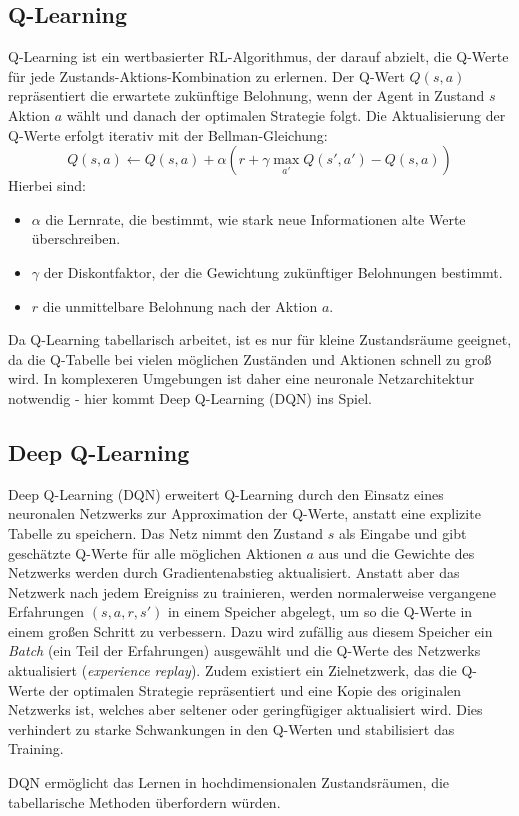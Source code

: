 \subsection{Q-Learning}
Q-Learning ist ein wertbasierter RL-Algorithmus, der darauf abzielt, die Q-Werte 
für jede Zustands-Aktions-Kombination zu erlernen. Der Q-Wert $Q(s,a)$ repräsentiert 
die erwartete zukünftige Belohnung, wenn der Agent in Zustand $s$ Aktion $a$ wählt 
und danach der optimalen Strategie folgt.
Die Aktualisierung der Q-Werte erfolgt iterativ mit der Bellman-Gleichung:
\begin{equation}
    Q(s,a) \leftarrow Q(s,a) + \alpha (r + \gamma \max_{a'}Q(s',a') - Q(s,a))
\end{equation}
Hierbei sind:
\begin{itemize}
    \item $\alpha$ die Lernrate, die bestimmt, wie stark neue Informationen alte Werte überschreiben.
    \item $\gamma$ der Diskontfaktor, der die Gewichtung zukünftiger Belohnungen bestimmt.
    \item $r$ die unmittelbare Belohnung nach der Aktion $a$.
\end{itemize}
Da Q-Learning tabellarisch arbeitet, ist es nur für kleine Zustandsräume geeignet, 
da die Q-Tabelle bei vielen möglichen Zuständen und Aktionen schnell zu groß wird. 
In komplexeren Umgebungen ist daher eine neuronale Netzarchitektur notwendig - 
hier kommt Deep Q-Learning (DQN) ins Spiel.

\subsection{Deep Q-Learning}
Deep Q-Learning (DQN) erweitert Q-Learning durch den Einsatz eines neuronalen 
Netzwerks zur Approximation der Q-Werte, anstatt eine explizite Tabelle zu 
speichern. Das Netz nimmt den Zustand $s$ als Eingabe und gibt geschätzte Q-Werte 
für alle möglichen Aktionen $a$ aus und die Gewichte des Netzwerks werden durch 
Gradientenabstieg aktualisiert. Anstatt aber das Netzwerk nach jedem Ereigniss zu 
trainieren, werden normalerweise vergangene Erfahrungen $(s,a,r,s')$ in einem 
Speicher abgelegt, um so die Q-Werte in einem großen Schritt zu verbessern.
Dazu wird zufällig aus diesem Speicher ein \textit{Batch} (ein Teil der Erfahrungen) 
ausgewählt und die Q-Werte des Netzwerks aktualisiert (\textit{experience replay}).
Zudem existiert ein Zielnetzwerk, das die Q-Werte der optimalen Strategie 
repräsentiert und eine Kopie des originalen Netzwerks ist, welches aber seltener
oder geringfügiger aktualisiert wird. Dies verhindert zu starke Schwankungen in den 
Q-Werten und stabilisiert das Training.

DQN ermöglicht das Lernen in hochdimensionalen Zustandsräumen, die 
tabellarische Methoden überfordern würden. 

